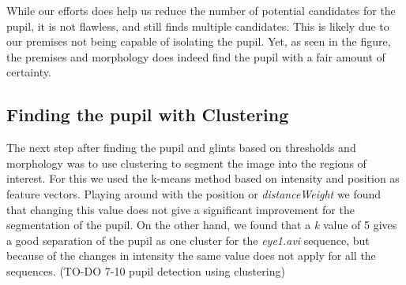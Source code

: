 While our efforts does help us reduce the number of potential candidates for the pupil, it is not flawless, and still finds multiple candidates. This is likely due to our premises not being capable of isolating the pupil. Yet, as seen in the figure, the premises and morphology does indeed find the pupil with a fair amount of certainty.
\newline

\subsection{Finding the pupil with Clustering}
The next step after finding the pupil and glints based on thresholds and morphology was to use clustering to segment the image into the regions of interest. For this we used the k-means method based on intensity and position as feature vectors. Playing around with the position or \emph{distanceWeight} we found that changing this value does not give a significant improvement for the segmentation of the pupil. On the other hand, we found that a \emph{k} value of 5 gives a good separation of the pupil as one cluster for the \emph{eye1.avi} sequence, but because of the changes in intensity the same value does not apply for all the sequences.  
(TO-DO 7-10 pupil detection using clustering)
